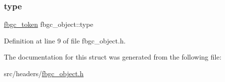 \subsubsection{\texorpdfstring{type}{type}}
{\footnotesize\ttfamily \hyperlink{tokens_8h_a9d21ebbf42e602eb0cf502c867d20a7e}{fbgc\+\_\+token} fbgc\+\_\+object\+::type}



Definition at line 9 of file fbgc\+\_\+object.\+h.



The documentation for this struct was generated from the following file\+:\begin{DoxyCompactItemize}
\item 
src/headers/\hyperlink{fbgc__object_8h}{fbgc\+\_\+object.\+h}\end{DoxyCompactItemize}
